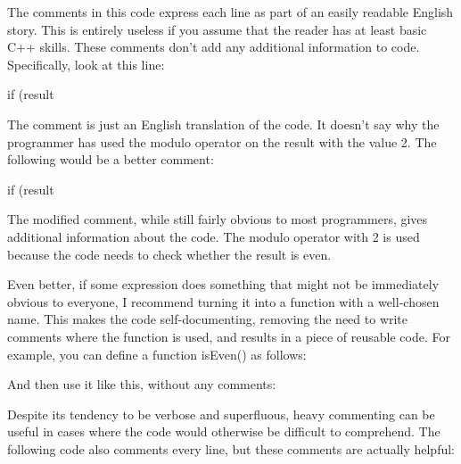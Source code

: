 
The comments in this code express each line as part of an easily readable English story. This is entirely useless if you assume that the reader has at least basic C++ skills. These comments don’t add any additional information to code. Specifically, look at this line:

\begin{cpp}
if (result %
\end{cpp}

The comment is just an English translation of the code. It doesn’t say why the programmer has used the modulo operator on the result with the value 2. The following would be a better comment:

\begin{cpp}
if (result %
\end{cpp}

The modified comment, while still fairly obvious to most programmers, gives additional information about the code. The modulo operator with 2 is used because the code needs to check whether the result is even.

Even better, if some expression does something that might not be immediately obvious to everyone, I recommend turning it into a function with a well-chosen name. This makes the code self-documenting, removing the need to write comments where the function is used, and results in a piece of reusable code. For example, you can define a function isEven() as follows:


And then use it like this, without any comments:

\begin{cpp}
if (isEven(result)) {
\end{cpp}

Despite its tendency to be verbose and superfluous, heavy commenting can be useful in cases where the code would otherwise be difficult to comprehend. The following code also comments every line, but these comments are actually helpful:

